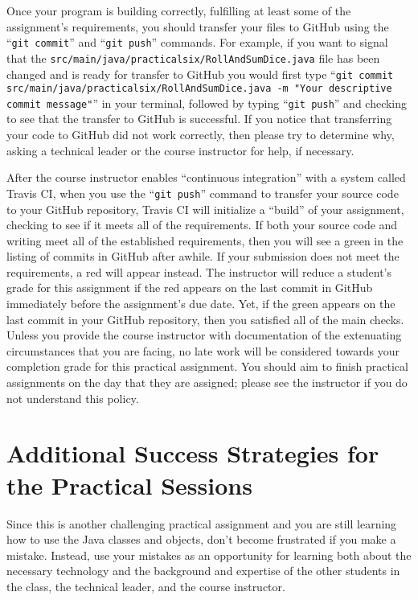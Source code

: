 \documentclass[11pt]{article}
\newcommand{\mainprogramsource}{\lstinline{src/main/java/practicalsix/RollAndSumDice.java}}
\newcommand{\gitcommit}{\command{git commit}}
\newcommand{\gitpush}{\command{git push}}
\newcommand{\gitcommitmainprogram}{\command{git commit src/main/java/practicalsix/RollAndSumDice.java -m "Your
descriptive commit message"}}
\newcommand{\command}[1]{``\lstinline{#1}''}
\newcommand{\step}[1]{``{#1}''}
\newcommand{\checkmark}{\ding{51}}
\newcommand{\naughtmark}{\ding{55}}
\begin{document}
Once your program is building correctly, fulfilling at least some of the
assignment's requirements, you should transfer your files to GitHub using the
\gitcommit{} and \gitpush{} commands. For example, if you want to signal that
the \mainprogramsource{} file has been changed and is ready for transfer to
GitHub you would first type \gitcommitmainprogram{} in your terminal, followed
by typing \gitpush{} and checking to see that the transfer to GitHub is
successful. If you notice that transferring your code to GitHub did not work
correctly, then please try to determine why, asking a technical leader or the
course instructor for help, if necessary.

After the course instructor enables \step{continuous integration} with a system
called Travis CI, when you use the \gitpush{} command to transfer your source
code to your GitHub repository, Travis CI will initialize a \step{build} of your
assignment, checking to see if it meets all of the requirements. If both your
source code and writing meet all of the established requirements, then you will
see a green \checkmark{} in the listing of commits in GitHub after awhile. If
your submission does not meet the requirements, a red \naughtmark{} will appear
instead. The instructor will reduce a student's grade for this assignment if the
red \naughtmark{} appears on the last commit in GitHub immediately before the
assignment's due date. Yet, if the green \checkmark{} appears on the last commit
in your GitHub repository, then you satisfied all of the main checks. Unless you
provide the course instructor with documentation of the extenuating
circumstances that you are facing, no late work will be considered towards your
completion grade for this practical assignment. You should aim to finish
practical assignments on the day that they are assigned; please see the
instructor if you do not understand this policy.

\section*{Additional Success Strategies for the Practical Sessions}

Since this is another challenging practical assignment and you are still
learning how to use the Java classes and objects, don't become frustrated if you
make a mistake. Instead, use your mistakes as an opportunity for learning both
about the necessary technology and the background and expertise of the other
students in the class, the technical leader, and the course instructor.
\end{document}
